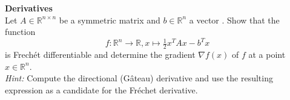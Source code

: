 \textbf{Derivatives}\\
Let $A \in \mathbb{R}^{n \times n}$ be a symmetric matrix  and $b \in\mathbb{R}^{n}$ a vector . Show that the function
$$f : \mathbb{R}^{n} \to \mathbb{R}, x \mapsto
\tfrac{1}{2} x^T Ax - b^T x$$
is Frechét differentiable and determine the gradient $\nabla f(x)$ of $f$ at a point $x \in\mathbb{R}^{n}$.\\[0.3cm]
\textit{Hint:} Compute the directional (Gâteau) derivative and use the resulting expression as a candidate for the
Fréchet derivative. 
